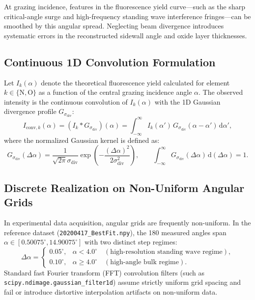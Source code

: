 \documentclass[11pt,a4paper]{article}
\newcommand{\dd}{\mathrm{d}}
\begin{document}
At grazing incidence, features in the fluorescence yield curve—such as the sharp critical-angle surge and high-frequency standing wave interference fringes—can be smoothed by this angular spread. Neglecting beam divergence introduces systematic errors in the reconstructed sidewall angle and oxide layer thicknesses.

\subsection{Continuous 1D Convolution Formulation}
Let $I_k(\alpha)$ denote the theoretical fluorescence yield calculated for element $k \in \{\mathrm{N}, \mathrm{O}\}$ as a function of the central grazing incidence angle $\alpha$. The observed intensity is the continuous convolution of $I_k(\alpha)$ with the 1D Gaussian divergence profile $G_{\sigma_{\mathrm{div}}}$:
\begin{equation}
    I_{\mathrm{conv}, k}(\alpha) = (I_k * G_{\sigma_{\mathrm{div}}})(\alpha) = \int_{-\infty}^{\infty} I_k(\alpha') \, G_{\sigma_{\mathrm{div}}}(\alpha - \alpha') \, \dd\alpha',
\end{equation}
where the normalized Gaussian kernel is defined as:
\begin{equation}
    G_{\sigma_{\mathrm{div}}}(\Delta\alpha) = \frac{1}{\sqrt{2\pi}\sigma_{\mathrm{div}}} \exp\left( -\frac{(\Delta\alpha)^2}{2\sigma_{\mathrm{div}}^2} \right), \qquad \int_{-\infty}^{\infty} G_{\sigma_{\mathrm{div}}}(\Delta\alpha) \, \dd(\Delta\alpha) = 1.
\end{equation}

\subsection{Discrete Realization on Non-Uniform Angular Grids}
In experimental data acquisition, angular grids are frequently non-uniform. In the reference dataset (\texttt{20200417\_BestFit.npy}), the 180 measured angles span $\alpha \in [0.50075^\circ, 14.90075^\circ]$ with two distinct step regimes:
\begin{equation}
    \Delta\alpha = \begin{cases} 0.05^\circ, & \alpha < 4.0^\circ \quad (\text{high-resolution standing wave regime}), \\ 0.10^\circ, & \alpha \ge 4.0^\circ \quad (\text{high-angle bulk regime}). \end{cases}
\end{equation}
Standard fast Fourier transform (FFT) convolution filters (such as \texttt{scipy.ndimage.gaussian\_filter1d}) assume strictly uniform grid spacing and fail or introduce distortive interpolation artifacts on non-uniform data.
\end{document}
